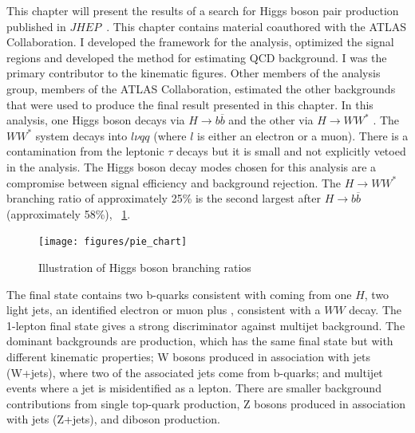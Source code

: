 This chapter will present the results of a search for Higgs boson pair production published in $JHEP$~\cite{Aaboud:2018zhh}. This chapter contains material coauthored with the ATLAS Collaboration. I developed the framework for the analysis, optimized the signal regions and developed the method for estimating QCD background. I was the primary contributor to the kinematic figures. Other members of the analysis group, members of the ATLAS Collaboration, estimated the other backgrounds that were used to produce the final result presented in this chapter. \newline
\indent In this analysis, one Higgs boson decays via ${H\rightarrow b\overline{b}}$ and the other via ${H\rightarrow WW^{*}}$ . The ${WW^{*}}$ system decays into ${l\nu qq}$ (where ${l}$ is either an electron or a muon). There is a contamination from the leptonic ${\tau}$ decays but it is small and not explicitly vetoed in the analysis. The Higgs boson decay modes chosen for this analysis are a compromise between signal efficiency and background rejection. The ${H\rightarrow WW^{*}}$ branching ratio of approximately 25\% is the second largest after ${H\rightarrow b\overline{b}}$ (approximately 58\%), ~\ref{fig:piechart}. \newline

\begin{figure}[h]
\begin{center}
\texttt{[image: figures/pie\_chart]}
\caption[Illustration of Higgs boson branching ratios]{Illustration of Higgs boson branching ratios\cite{Qdiaries}}
\label{fig:piechart}
\end{center}
\end{figure}

\indent The final state contains two b-quarks consistent with coming from one $H$, two light jets, an identified electron or muon plus \met{}, consistent with a $WW$ decay. The 1-lepton final state gives a strong discriminator against multijet background. The dominant backgrounds are \ttbar{} production, which has the same final state but with different kinematic properties; W bosons produced in association with jets (W+jets), where two of the associated jets come from b-quarks; and multijet events where a jet is misidentified as a lepton. There are smaller background contributions from single top-quark production, Z bosons produced in association with jets (Z+jets), and diboson production.\newline

